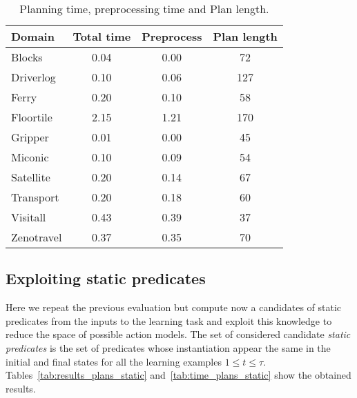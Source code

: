 \documentclass[letterpaper]{article} %
\begin{document}
\begin{table}[hbt!]
\begin{footnotesize}
	\begin{center}
		\begin{tabular}{l|c|c|c|}			
			Domain & Total time & Preprocess & Plan length  \\
			\hline
			Blocks & 0.04 & 0.00 & 72 \\
			Driverlog & 0.10 & 0.06 & 127 \\
			Ferry & 0.20 & 0.10 & 58 \\
			Floortile & 2.15 & 1.21 & 170 \\
			Gripper & 0.01 & 0.00 & 45 \\
			Miconic & 0.10 & 0.09 & 54 \\
			Satellite & 0.20 & 0.14 & 67 \\
			Transport & 0.20 & 0.18 & 60 \\
			Visitall & 0.43 & 0.39 & 37 \\
			Zenotravel & 0.37 & 0.35 & 70			
		\end{tabular}
	\end{center}
        \end{footnotesize}
	\caption{\small Planning time, preprocessing time and Plan length.}
	\label{tab:time_plans}	
\end{table}

\subsection{Exploiting static predicates}
Here we repeat the previous evaluation but compute now a candidates of static predicates from the inputs to the learning task and exploit this knowledge to reduce the space of possible action models. The set of considered candidate {\em static predicates} is the set of predicates whose instantiation appear the same in the initial and final states for all the learning examples {\small $1\leq t\leq \tau$}. Tables~\ref{tab:results_plans_static} and~\ref{tab:time_plans_static} show the obtained results.	
\end{document}
